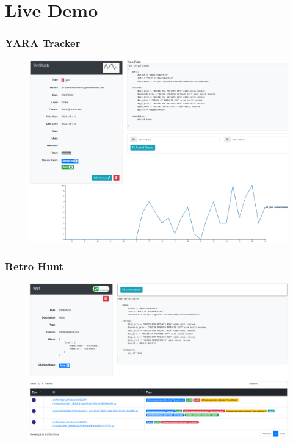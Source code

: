 \documentclass{beamer}
\begin{document}
\section{Live Demo}

\begin{frame}
    \frametitle{YARA Tracker}
        \begin{figure}
            \includegraphics[scale=0.22]{screenshot/tracker_yara.png}
        \end{figure}
\end{frame}

\begin{frame}
    \frametitle{Retro Hunt}
        \begin{figure}
            \includegraphics[scale=0.22]{screenshot/retro_hunt.png}
        \end{figure}
\end{frame}
\end{document}
